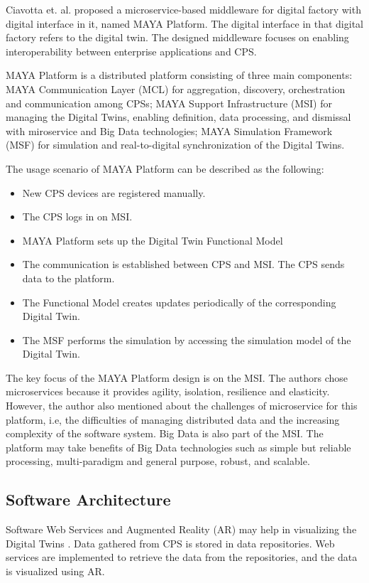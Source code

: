 \documentclass[article]{aaltoseries}
\begin{document}
Ciavotta et. al. \cite{ciavotta2017microservice} proposed a microservice-based middleware for digital factory with digital interface in it, named MAYA Platform. The digital interface in that digital factory refers to the digital twin. The designed middleware focuses on enabling interoperability between enterprise applications and CPS.

MAYA Platform is a distributed platform consisting of three main components: MAYA Communication Layer (MCL) for aggregation, discovery, orchestration and communication among CPSs; MAYA Support Infrastructure (MSI) for managing the Digital Twins, enabling definition, data processing, and dismissal with miroservice and Big Data technologies; MAYA Simulation Framework (MSF) for simulation and real-to-digital synchronization of the Digital Twins.

The usage scenario of MAYA Platform can be described as the following:
\begin{itemize}
	\item New CPS devices are registered manually.
	\item The CPS logs in on MSI.
	\item MAYA Platform sets up the Digital Twin Functional Model
	\item The communication is established between CPS and MSI. The CPS sends data to the platform.
	\item The Functional Model creates updates periodically of the corresponding Digital Twin.
	\item The MSF performs the simulation by accessing the simulation model of the Digital Twin.
\end{itemize}

The key focus of the MAYA Platform design is on the MSI. The authors chose microservices because it provides agility, isolation, resilience and elasticity. However, the author also mentioned about the challenges of microservice for this platform, i.e, the difficulties of managing distributed data and the increasing complexity of the software system. Big Data is also part of the MSI. The platform may take benefits of Big Data technologies such as simple but reliable processing, multi-paradigm and general purpose, robust, and scalable.

\subsection{Software Architecture}
Software Web Services and Augmented Reality (AR) may help in visualizing the Digital Twins \cite{schroeder2016visualising}. Data gathered from CPS is stored in data repositories. Web services are implemented to retrieve the data from the repositories, and the data is visualized using AR.
\end{document}
